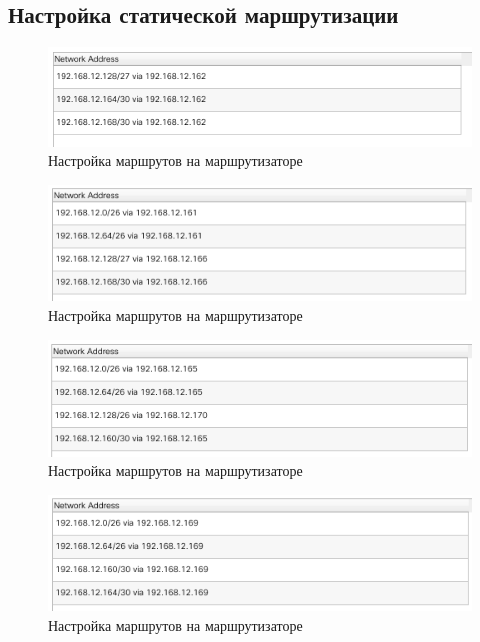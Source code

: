 \documentclass[12pt]{report}
\begin{document}
\subsection*{Настройка статической маршрутизации}

\begin{figure}[H]
	\begin{center}
		\includegraphics[scale=0.75]{img/5.png}
	\end{center}
	\caption{Настройка маршрутов на маршрутизаторе}
	\label{fig:5}
\end{figure}

\begin{figure}[H]
	\begin{center}
		\includegraphics[scale=0.75]{img/6.png}
	\end{center}
	\caption{Настройка маршрутов на маршрутизаторе}
	\label{fig:6}
\end{figure}

\begin{figure}[H]
	\begin{center}
		\includegraphics[scale=0.75]{img/7.png}
	\end{center}
	\caption{Настройка маршрутов на маршрутизаторе}
	\label{fig:7}
\end{figure}

\begin{figure}[H]
	\begin{center}
		\includegraphics[scale=0.75]{img/8.png}
	\end{center}
	\caption{Настройка маршрутов на маршрутизаторе}
	\label{fig:8}
\end{figure}
\end{document}
